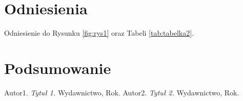 \documentclass{article}
\begin{document}
\section{Odniesienia}
    Odniesienie do Rysunku \ref{fig:rys1} oraz Tabeli \ref{tab:tabelka2}.

\section{Podsumowanie}
    \lipsum[5]

\begin{thebibliography}{99}
     Autor1. \emph{Tytuł 1.} Wydawnictwo, Rok.
     Autor2. \emph{Tytuł 2.} Wydawnictwo, Rok.
\end{thebibliography}
\end{document}
